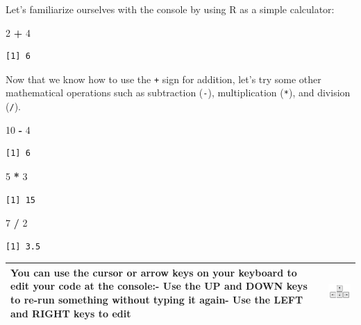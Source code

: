 \documentclass[]{article}
\newenvironment{Shaded}{\begin{snugshade}}{\end{snugshade}}
\newcommand{\DecValTok}[1]{\textcolor[rgb]{0.00,0.00,0.81}{#1}}
\newcommand{\StringTok}[1]{\textcolor[rgb]{0.31,0.60,0.02}{#1}}
\newcommand{\OperatorTok}[1]{\textcolor[rgb]{0.81,0.36,0.00}{\textbf{#1}}}
\theoremstyle{definition}
\theoremstyle{definition}
\theoremstyle{definition}
\theoremstyle{remark}
\begin{document}
Let's familiarize ourselves with the console by using R as a simple
calculator:

\begin{Shaded}
\begin{Highlighting}[]
\DecValTok{2} \OperatorTok{+}\StringTok{ }\DecValTok{4}
\end{Highlighting}
\end{Shaded}

\begin{verbatim}
[1] 6
\end{verbatim}

Now that we know how to use the \texttt{+} sign for addition, let's try
some other mathematical operations such as subtraction (\texttt{-}),
multiplication (\texttt{*}), and division (\texttt{/}).

\begin{Shaded}
\begin{Highlighting}[]
\DecValTok{10} \OperatorTok{-}\StringTok{ }\DecValTok{4}
\end{Highlighting}
\end{Shaded}

\begin{verbatim}
[1] 6
\end{verbatim}

\begin{Shaded}
\begin{Highlighting}[]
\DecValTok{5} \OperatorTok{*}\StringTok{ }\DecValTok{3}
\end{Highlighting}
\end{Shaded}

\begin{verbatim}
[1] 15
\end{verbatim}

\begin{Shaded}
\begin{Highlighting}[]
\DecValTok{7} \OperatorTok{/}\StringTok{ }\DecValTok{2}
\end{Highlighting}
\end{Shaded}

\begin{verbatim}
[1] 3.5
\end{verbatim}

\begin{longtable}[]{@{}ll@{}}
\toprule
\begin{minipage}[t]{0.69\columnwidth}\raggedright\strut
You can use the cursor or arrow keys on your keyboard to edit your code
at the console:- Use the UP and DOWN keys to re-run something without
typing it again- Use the LEFT and RIGHT keys to edit\strut
\end{minipage} & \begin{minipage}[t]{0.25\columnwidth}\raggedright\strut
\includegraphics{./img/rstudio_cursorkeys.png}\strut
\end{minipage}\tabularnewline
\bottomrule
\end{longtable}
\end{document}
